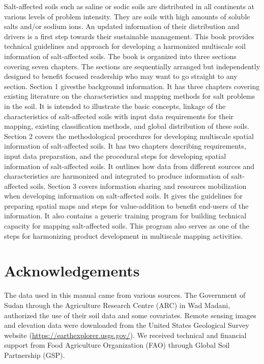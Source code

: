 \documentclass[
  10pt,
  b5paper,
]{book}
\begin{document}
Salt-affected soils such as saline or sodic soils are distributed in all continents at various levels of problem intensity.
They are soils with high amounts of soluble salts and/or sodium ions. An updated information of their distribution
and drivers is a first step towards their sustainable management. This book provides technical guidelines and
approach for developing a harmonized multiscale soil information of salt-affected soils. The book is organized into
three sections covering seven chapters. The sections are sequentially arranged but independently designed to
benefit focused readership who may want to go straight to any section. Section 1 givesthe background information.
It has three chapters covering existing literature on the characteristics and mapping methods for salt problems in
the soil. It is intended to illustrate the basic concepts, linkage of the characteristics of salt-affected soils with input
data requirements for their mapping, existing classification methods, and global distribution of these soils. Section
2 covers the methodological procedures for developing multiscale spatial information of salt-affected soils. It has
two chapters describing requirements, input data preparation, and the procedural steps for developing spatial
information of salt-affected soils. It outlines how data from different sources and characteristics are harmonized
and integrated to produce information of salt-affected soils. Section 3 covers information sharing and resources
mobilization when developing information on salt-affected soils. It gives the guidelines for preparing spatial maps
and steps for value-addition to benefit end-users of the information. It also contains a generic training program for
building technical capacity for mapping salt-affected soils. This program also serves as one of the steps for
harmonizing product development in multiscale mapping activities.

\hypertarget{acknowledgements}{%
\chapter*{Acknowledgements}\label{acknowledgements}}

The data used in this manual came from various sources. The Government of Sudan through the
Agriculture Research Centre (ARC) in Wad Madani, authorized the use of their soil data and some
covariates. Remote sensing images and elevation data were downloaded from the United States
Geological Survey website (\url{https://earthexplorer.usgs.gov/}). We received technical and financial support
from Food Agriculture Organization (FAO) through Global Soil Partnership (GSP).
\end{document}
